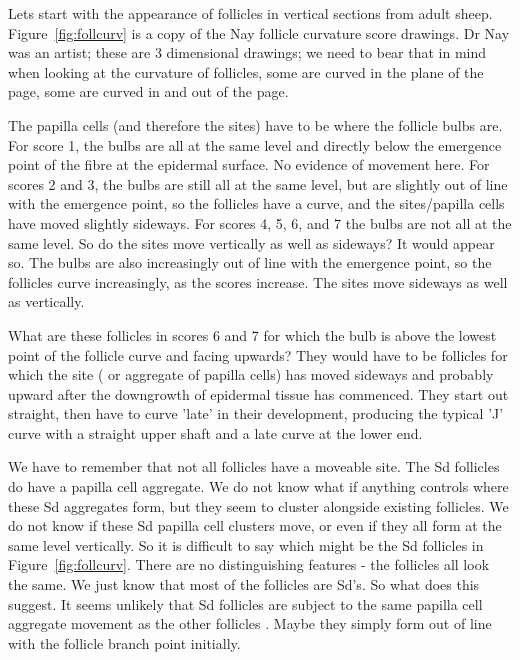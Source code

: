 \documentclass[titlepage]{article}  %
\begin{document}
Lets start with the appearance of follicles in vertical sections from adult sheep. Figure~\ref{fig:follcurv} is a copy of the Nay follicle curvature score drawings. Dr Nay was an artist; these are 3 dimensional drawings; we need to bear that in mind when looking at the curvature of follicles, some are curved in the plane of the page, some are curved in and out of the page. 


The papilla cells (and therefore the sites) have to be where the follicle bulbs are. For score 1, the bulbs are all at the same level and directly below the emergence point of the fibre at the epidermal surface. No evidence of movement here. For scores 2 and 3, the bulbs are still all at the same level, but are slightly out of line with the emergence point, so the follicles have a curve, and the sites/papilla cells have moved slightly sideways. For scores 4, 5, 6, and 7 the bulbs are not all at the same level. So do the sites move vertically as well as sideways? It would appear so.  The bulbs are also increasingly out of line with the emergence point, so the follicles curve increasingly, as the scores increase. The sites move sideways as well as vertically. 

What are these follicles in scores 6 and 7 for which the bulb is above the lowest point of the follicle curve and facing upwards?  They would have to be follicles for which the site ( or aggregate of papilla cells) has moved sideways and probably upward after the downgrowth of epidermal tissue has commenced.  They start out straight, then have to curve 'late' in their development, producing the typical 'J' curve with a straight upper shaft and a late curve at the lower end.
 
We have to remember that not all follicles have a moveable site. The Sd follicles  do have a papilla cell aggregate. We do not know  what if anything controls where these Sd aggregates form, but they  seem to cluster alongside existing follicles. We do not know if these Sd papilla cell clusters move, or even if they all form at the same level vertically. So it is difficult to say which might be the Sd follicles in Figure~\ref{fig:follcurv}. There are no distinguishing features - the follicles all look the same. We just know that most of the follicles are Sd's. So what does this suggest. It seems unlikely that  Sd follicles are subject to the same papilla cell aggregate movement as the other follicles . Maybe they simply form out of line with the follicle branch point initially. 
\end{document}

